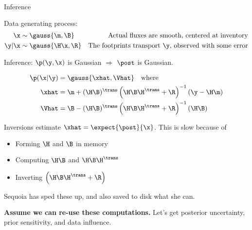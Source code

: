 \documentclass[8pt]{beamer}\usepackage[]{graphicx}\usepackage[]{color}
\begin{document}

\begin{frame}{Inference}

Data generating process:
$$
\begin{aligned}
\x \sim{}& \gauss{\m, \B} & 
   \textrm{Actual fluxes are smooth, centered at inventory} \\
\y \vert \x \sim{}& \gauss{\H \x, \R} & 
   \textrm{The footprints transport }\y\textrm{, observed with some error} \\
\end{aligned}
$$

Inference: $\p(\y,\x)$ is Gaussian $\Rightarrow$ $\post$ is Gaussian.

$$
\begin{aligned}
   \p(\x \vert \y) ={}& \gauss{\xhat, \Vhat} \quad\textrm{where}\\
   \xhat ={}& \m + (\H \B)^\trans \left(
      \H \B \H^\trans + \R
    \right)^{-1} \left(\y - \H \m \right) \\
   \Vhat ={}& \B - (\H \B)^\trans \left(
      \H \B \H^\trans + \R
   \right)^{-1} (\H \B) \\
\end{aligned}
$$

\pause

Inversions estimate $\xhat = \expect{\post}{\x}$.  This is slow because of
%
\begin{itemize}
\item Forming $\H$ and $\B$ in memory
\item Computing $\H \B$ and $\H \B \H^\trans$
\item Inverting $\left(\H \B \H^\trans + \R\right)$
\end{itemize}
%
Sequoia has sped these up, and also saved to disk what she can.

\textbf{Assume we can re-use these computations.}  Let's get posterior
uncertainty, prior sensitivity, and data influence.


\end{frame}


\end{document}
